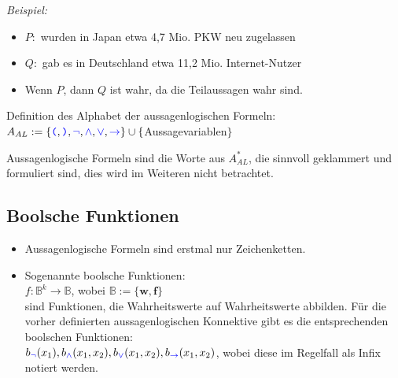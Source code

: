 \documentclass{article}
\newcommand{\blue}[1]{\textcolor{blue}{#1}}
\newcommand{\important}[1]{\textcolor{importantColor}{#1}}
\newcommand{\example}[1]{\textit{Beispiel: }#1}
\newcommand{\word}[1]{\blue{\texttt{#1}}}
\newcommand{\set}[1]{\{#1\}}
\newcommand{\anfuehrung}[1]{\flqq #1\frqq}
\begin{document}
\example
\begin{itemize}
    \item $P:$ \anfuehrung{2014 wurden in Japan etwa 4,7 Mio. PKW neu zugelassen}
    \item $Q:$ \anfuehrung{1999 gab es in Deutschland etwa 11,2 Mio. Internet-Nutzer}
    \item \anfuehrung{Wenn $P$, dann $Q$} ist wahr, da die Teilaussagen wahr sind.
\end{itemize}
Definition des Alphabet der aussagenlogischen Formeln:\\\qquad $A_{AL} := \set{\word{(}, \word{)}, \word{$\lnot$}, \word{$\land$}, \word{$\lor$}, \word{$\rightarrow$}} \cup \set{$Aussagevariablen$}$

Aussagenlogische Formeln sind die Worte aus $A^*_{AL}$, die sinnvoll geklammert und formuliert sind, dies wird im Weiteren nicht betrachtet.

\subsection{Boolsche Funktionen}
\begin{itemize}
    \item Aussagenlogische Formeln sind erstmal nur Zeichenketten.
    \item Sogenannte \important{boolsche Funktionen}:\\
    $f: \mathbb{B}^k \to \mathbb{B}$, \qquad wobei $\mathbb{B}:= \set{\textbf{w}, \textbf{f}}$\\
    sind Funktionen, die Wahrheitswerte auf Wahrheitswerte abbilden. Für die vorher definierten aussagenlogischen Konnektive gibt es die entsprechenden boolschen Funktionen:\\
    $b_{\word{$\lnot$}}(x_1), b_{\word{$\land$}}(x_1, x_2), b_{\word{$\lor$}}(x_1, x_2), b_{\word{$\rightarrow$}}(x_1, x_2)$, wobei diese im Regelfall als Infix notiert werden.
\end{itemize}
\end{document}
